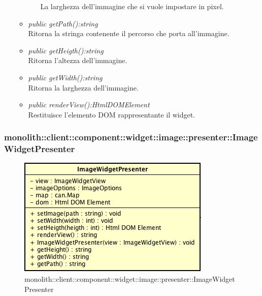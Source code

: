 \begin{itemize}
\begin{itemize}
\begin{itemize}
		La larghezza dell'immagine che si vuole impostare in pixel.
		\end{itemize} 
	\item \textit{public getPath():string}\\
	Ritorna la stringa contenente il percorso che porta all'immagine.
	\item \textit{public getHeigth():string}\\
	Ritorna l'altezza dell'immagine.
	\item \textit{public getWidth():string}\\
	Ritorna la larghezza dell'immagine.
	\item \textit{public renderView():HtmlDOMElement}\\
	Restituisce l'elemento DOM rappresentante il widget.
	\end{itemize}
\end{itemize}

\subsubsection{monolith::client::component::widget::image::presenter::ImageWidgetPresenter}

\label{monolith::client::component::widget::image::presenter::ImageWidgetPresenter}
\begin{figure}[H]
	\centering
	\includegraphics[scale=0.5]{Sezioni/SottosezioniST/img/ImageWidgetPresenter.png}
	\caption{monolith::client::component::widget::image::presenter::ImageWidgetPresenter}
\end{figure}

